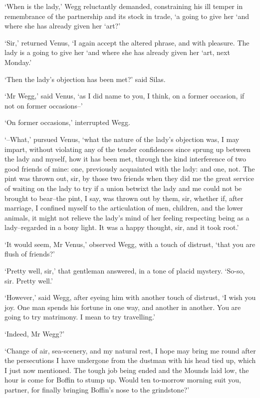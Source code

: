 ‘When is the lady,’ Wegg reluctantly demanded, constraining his ill
temper in remembrance of the partnership and its stock in trade, ‘a
going to give her ‘and where she has already given her ‘art?’

‘Sir,’ returned Venus, ‘I again accept the altered phrase, and with
pleasure. The lady is a going to give her ‘and where she has already
given her ‘art, next Monday.’

‘Then the lady’s objection has been met?’ said Silas.

‘Mr Wegg,’ said Venus, ‘as I did name to you, I think, on a former
occasion, if not on former occasions--’

‘On former occasions,’ interrupted Wegg.

‘--What,’ pursued Venus, ‘what the nature of the lady’s objection was, I
may impart, without violating any of the tender confidences since sprung
up between the lady and myself, how it has been met, through the kind
interference of two good friends of mine: one, previously acquainted
with the lady: and one, not. The pint was thrown out, sir, by those two
friends when they did me the great service of waiting on the lady to
try if a union betwixt the lady and me could not be brought to bear--the
pint, I say, was thrown out by them, sir, whether if, after marriage,
I confined myself to the articulation of men, children, and the lower
animals, it might not relieve the lady’s mind of her feeling respecting
being as a lady--regarded in a bony light. It was a happy thought, sir,
and it took root.’

‘It would seem, Mr Venus,’ observed Wegg, with a touch of distrust,
‘that you are flush of friends?’

‘Pretty well, sir,’ that gentleman answered, in a tone of placid
mystery. ‘So-so, sir. Pretty well.’

‘However,’ said Wegg, after eyeing him with another touch of distrust,
‘I wish you joy. One man spends his fortune in one way, and another in
another. You are going to try matrimony. I mean to try travelling.’

‘Indeed, Mr Wegg?’

‘Change of air, sea-scenery, and my natural rest, I hope may bring me
round after the persecutions I have undergone from the dustman with his
head tied up, which I just now mentioned. The tough job being ended and
the Mounds laid low, the hour is come for Boffin to stump up. Would ten
to-morrow morning suit you, partner, for finally bringing Boffin’s nose
to the grindstone?’

